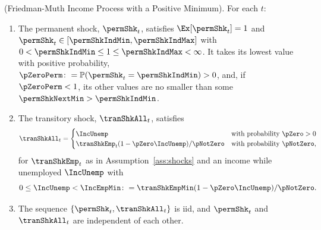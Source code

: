 \documentclass[\econtexRoot/BufferStockTheory]{subfiles}
\begin{document}
\begin{assumI}\label{ass:shocksPositiveMinimum}(Friedman-Muth Income Process with a Positive Minimum).
For each $t$:
\begin{enumerate}
\item The permanent shock, $\permShk_{t}$, satisfies $\Ex[\permShk_{t}]=1$ and $\permShk_{t}\in[\permShkIndMin,\permShkIndMax]$ with $0<\permShkIndMin\leq 1\leq\permShkIndMax<\infty$.
It takes its lowest value with positive probability, $\pZeroPerm\colon=\mathbb{P}(\permShk_{t}=\permShkIndMin)>0$, and, if $\pZeroPerm<1$, its other values are no smaller than some $\permShkNextMin>\permShkIndMin$.
\item The transitory shock, $\tranShkAll_{t}$, satisfies
\begin{equation}\label{eq:TranShkDefPositiveMinimum}
  \tranShkAll_{t}=
  \begin{cases}
    \IncUnemp & \text{with probability $\pZero>0$} \\
    \tranShkEmp_{t}(1-\pZero\IncUnemp)/\pNotZero & \text{with probability $\pNotZero$},
  \end{cases}
\end{equation}
for $\tranShkEmp_{t}$ as in Assumption~\ref{ass:shocks} and an income while unemployed $\IncUnemp$ with
\begin{equation}\label{eq:MinIncomeBelowEmployed}
  0\leq\IncUnemp<\IncEmpMin\colon=\tranShkEmpMin(1-\pZero\IncUnemp)/\pNotZero .
\end{equation}
\item The sequence $\{\permShk_{t},\tranShkAll_{t}\}$ is iid, and $\permShk_{t}$ and $\tranShkAll_{t}$ are independent of each other.
\end{enumerate}
\end{assumI}
\end{document}
